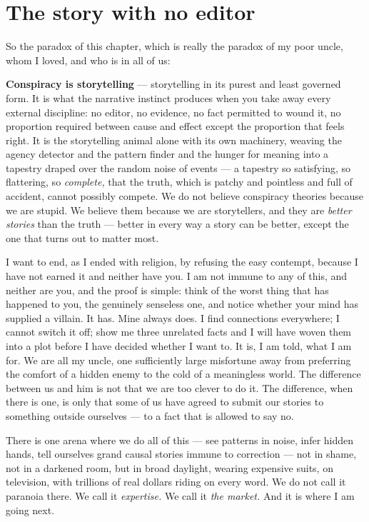 \section*{The story with no editor}

So the paradox of this chapter, which is really the paradox of my poor uncle, whom I loved, and who is in all of us:

\textbf{Conspiracy is storytelling} — storytelling in its purest and least governed form. It is what the narrative instinct produces when you take away every external discipline: no editor, no evidence, no fact permitted to wound it, no proportion required between cause and effect except the proportion that feels right. It is the storytelling animal alone with its own machinery, weaving the agency detector and the pattern finder and the hunger for meaning into a tapestry draped over the random noise of events — a tapestry so satisfying, so flattering, so \emph{complete,} that the truth, which is patchy and pointless and full of accident, cannot possibly compete. We do not believe conspiracy theories because we are stupid. We believe them because we are storytellers, and they are \emph{better stories} than the truth — better in every way a story can be better, except the one that turns out to matter most.

I want to end, as I ended with religion, by refusing the easy contempt, because I have not earned it and neither have you. I am not immune to any of this, and neither are you, and the proof is simple: think of the worst thing that has happened to you, the genuinely senseless one, and notice whether your mind has supplied a villain. It has. Mine always does. I find connections everywhere; I cannot switch it off; show me three unrelated facts and I will have woven them into a plot before I have decided whether I want to. It is, I am told, what I am for. We are all my uncle, one sufficiently large misfortune away from preferring the comfort of a hidden enemy to the cold of a meaningless world. The difference between us and him is not that we are too clever to do it. The difference, when there is one, is only that some of us have agreed to submit our stories to something outside ourselves — to a fact that is allowed to say no.

There is one arena where we do all of this — see patterns in noise, infer hidden hands, tell ourselves grand causal stories immune to correction — not in shame, not in a darkened room, but in broad daylight, wearing expensive suits, on television, with trillions of real dollars riding on every word. We do not call it paranoia there. We call it \emph{expertise.} We call it \emph{the market.} And it is where I am going next.

